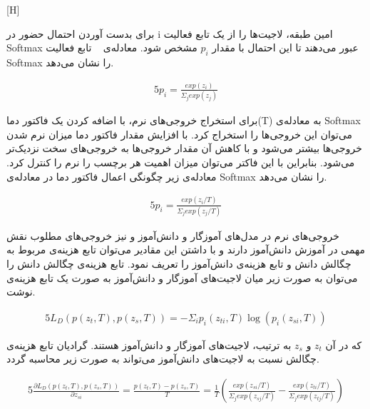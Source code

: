 [H]

برای بدست آوردن احتمال حضور در i امین طبقه، لاجیت‌ها را از یک تابع فعالیت Softmax عبور می‌دهند تا این احتمال با مقدار $p_i$ مشخص شود. معادله‌ی ~ تابع فعالیت Softmax را نشان می‌دهد.

\begin{alignat}{5}
	p_i = \frac{exp(z_i)}{\Sigma_j exp(z_j)}    \label{softmax} 
\end{alignat}

برای استخراج خروجی‌های نرم، با اضافه کردن یک فاکتور دما(T) به معادله‌ی Softmax می‌توان این خروجی‌ها را استخراج کرد. با افزایش مقدار فاکتور دما میزان نرم‌ شدن خروجی‌ها بیشتر می‌شود و با کاهش آن مقدار خروجی‌ها به خروجی‌های سخت نزدیک‌تر می‌شود. بنابراین با این فاکتر می‌توان میزان اهمیت هر برچسب را نرم را کنترل کرد. معادله‌ی زیر چگونگی اعمال فاکتور دما در معادله‌ی Softmax را نشان می‌دهد.

\begin{alignat}{5}
	p_i = \frac{exp(z_i/T)}{\Sigma_j exp(z_j/T)}    \label{softsoftmax} 
\end{alignat}

خروجی‌های نرم در مدل‌های آموزگار و دانش‌آموز و نیز خروجی‌های مطلوب نقش مهمی در آموزش دانش‌آموز دارند و با داشتن این مقادیر می‌توان تابع‌ هزینه‌ی مربوط به چگالش دانش و 
تابع هزینه‌ی دانش‌آموز را تعریف نمود. تابع هزینه‌ی چگالش دانش را می‌توان به صورت زیر میان لاجیت‌های آموز‌گار و دانش‌آموز به صورت یک تابع هزینه‌ی  نوشت. 

\begin{alignat}{5}
	L_D(p(z_t,T), p(z_s,T)) = -\Sigma_i p_i(z_{ti},T) \log(p_i(z_{si},T))    \label{ld} 
\end{alignat}

که در آن $z_t$ و $z_s$ به ترتیب، لاجیت‌های آموزگار و دانش‌آموز هستند. گرادیان تابع‌ هزینه‌ی چگالش نسبت به لاجیت‌های دانش‌آموز می‌تواند به صورت زیر محاسبه گردد.

\begin{alignat}{5}
	\frac{\partial L_D(p(z_t,T), p(z_s,T))}{\partial z_{si}} = \frac{p(z_t,T) - p(z_s,T)}{T}    
	= \frac{1}{T}(\frac{exp(z_{si}/T)}{\Sigma_j exp(z_{sj}/T)}  -\frac{exp(z_{ti}/T)}{\Sigma_j exp(z_{tj}/T)}) \label{gradld}
\end{alignat}

